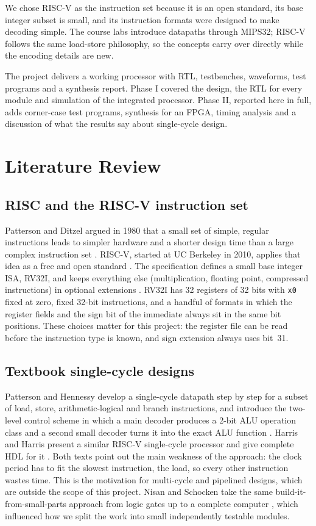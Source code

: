 \documentclass[conference]{IEEEtran}
\begin{document}
We chose RISC-V as the instruction set because it is an open standard, its
base integer subset is small, and its instruction formats were designed to
make decoding simple. The course labs introduce datapaths through MIPS32;
RISC-V follows the same load-store philosophy, so the concepts carry over
directly while the encoding details are new.

The project delivers a working processor with RTL, testbenches, waveforms,
test programs and a synthesis report. Phase I covered the design, the RTL for
every module and simulation of the integrated processor. Phase II, reported
here in full, adds corner-case test programs, synthesis for an FPGA, timing
analysis and a discussion of what the results say about single-cycle design.

\section{Literature Review}

\subsection{RISC and the RISC-V instruction set}
Patterson and Ditzel argued in 1980 that a small set of simple, regular
instructions leads to simpler hardware and a shorter design time than a large
complex instruction set \cite{patterson1980}. RISC-V, started at UC Berkeley
in 2010, applies that idea as a free and open standard \cite{asanovic2014}.
The specification defines a small base integer ISA, RV32I, and keeps
everything else (multiplication, floating point, compressed instructions) in
optional extensions \cite{riscvspec}. RV32I has 32 registers of 32 bits with
\texttt{x0} fixed at zero, fixed 32-bit instructions, and a handful of
formats in which the register fields and the sign bit of the immediate always
sit in the same bit positions. These choices matter for this project: the
register file can be read before the instruction type is known, and sign
extension always uses bit~31.

\subsection{Textbook single-cycle designs}
Patterson and Hennessy develop a single-cycle datapath step by step for a
subset of load, store, arithmetic-logical and branch instructions, and
introduce the two-level control scheme in which a main decoder produces a
2-bit ALU operation class and a second small decoder turns it into the exact
ALU function \cite{patterson2020}. Harris and Harris present a similar
RISC-V single-cycle processor and give complete HDL for it
\cite{harris2021}. Both texts point out the main weakness of the approach:
the clock period has to fit the slowest instruction, the load, so every other
instruction wastes time. This is the motivation for multi-cycle and pipelined
designs, which are outside the scope of this project. Nisan and Schocken take
the same build-it-from-small-parts approach from logic gates up to a complete
computer \cite{nisan2021}, which influenced how we split the work into small
independently testable modules.
\end{document}
